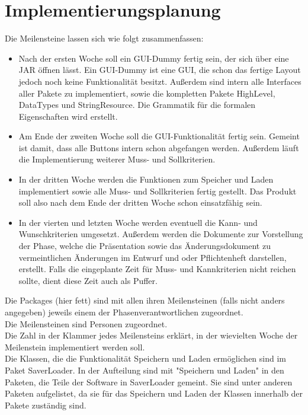 \documentclass[a4paper]{scrreprt}
\begin{document}
\chapter{Implementierungsplanung}

Die Meilensteine lassen sich wie folgt zusammenfassen: \\
\begin{itemize} 
\item Nach der ersten Woche soll ein GUI-Dummy fertig sein, der sich über eine JAR öffnen lässt. Ein GUI-Dummy ist eine GUI, die schon das fertige Layout jedoch noch keine Funktionalität besitzt. Außerdem sind intern alle Interfaces aller Pakete zu implementiert, sowie die kompletten Pakete HighLevel, DataTypes und StringResource. Die Grammatik für die formalen Eigenschaften wird erstellt.
\item Am Ende der zweiten Woche soll die GUI-Funktionalität fertig sein. Gemeint ist damit, dass alle Buttons intern schon abgefangen werden. Außerdem läuft die Implementierung weiterer Muss- und Sollkriterien. 
\item In der dritten Woche werden die Funktionen zum Speicher und Laden implementiert sowie alle Muss- und Sollkriterien fertig gestellt. Das Produkt soll also nach dem Ende der dritten Woche schon einsatzfähig sein.
\item In der vierten und letzten Woche werden eventuell die Kann- und Wunschkriterien umgesetzt. Außerdem werden die Dokumente zur Vorstellung der Phase, welche die Präsentation sowie das Änderungsdokument zu vermeintlichen Änderungen im Entwurf und oder Pflichtenheft darstellen, erstellt. Falls die eingeplante Zeit für Muss- und Kannkriterien nicht reichen sollte, dient diese Zeit auch als Puffer.
\end{itemize} 

Die Packages (hier fett) sind mit allen ihren Meilensteinen (falls nicht anders angegeben) jeweils einem der Phasenverantwortlichen zugeordnet. \\
Die Meilensteinen sind Personen zugeordnet. \\
Die Zahl in der Klammer jedes Meilensteins erklärt, in der wievielten Woche der Meilenstein implementiert werden soll. \\
Die Klassen, die die Funktionalität Speichern und Laden ermöglichen sind im Paket SaverLoader. In der Aufteilung sind mit "Speichern und Laden" in den Paketen, die Teile der Software in SaverLoader gemeint. Sie sind unter anderen Paketen aufgelistet, da sie für das Speichern und Laden der Klassen innerhalb der Pakete zuständig sind.
\end{document}
